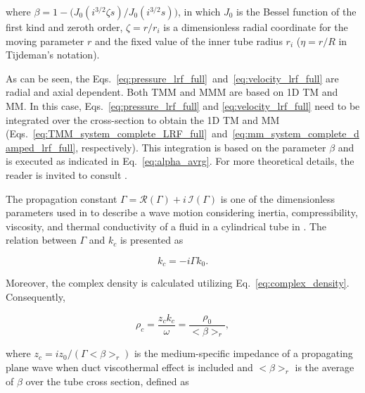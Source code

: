 \documentclass[12pt]{article}
\begin{document}

\noindent where $\beta = 1 - \big( J_0(i^{3/2} \zeta s) /J_0(i^{3/2} s) \big)$, in which $J_0$ is the Bessel function of the first kind and zeroth order,  $\zeta = r/r_i$ is a dimensionless radial coordinate for the moving parameter $r$ and the fixed value of the inner tube radius $r_i$ ($\eta = r/R$ in Tijdeman's notation). 

As can be seen, the Eqs.~\ref{eq:pressure_lrf_full}~and~\ref{eq:velocity_lrf_full} are radial and axial dependent. Both \acrshort{TMM} and \acrshort{MMM} are based on 1D \acrshort{TM} and \acrshort{MM}. In this case, Eqs.~\ref{eq:pressure_lrf_full} and \ref{eq:velocity_lrf_full} need to be integrated over the cross-section to obtain the 1D \acrshort{TM} and \acrshort{MM} (Eqs.~\ref{eq:TMM_system_complete_LRF_full}~and~\ref{eq:mm_system_complete_damped_lrf_full}, respectively). This integration is based on the parameter $\beta$ and is executed as indicated in Eq.~\ref{eq:alpha_avrg}. For more theoretical details, the reader is invited to consult \cite{TIJDEMAN19751, stinson}.

The propagation constant $\Gamma = \mathcal{R}(\Gamma) + i \, \mathcal{I}(\Gamma)$ is one of the dimensionless parameters used in \cite{TIJDEMAN19751} to describe a wave motion considering inertia, compressibility, viscosity,
and thermal conductivity of a fluid in a cylindrical tube in \cite{TIJDEMAN19751}. The relation between $\Gamma$ and $k_c$ is presented as \cite{TIJDEMAN19751,eerden_phdthesis_2000,mareze_jsv}

\begin{equation}\label{eq:kc_lrffull}
	k_c = -i \Gamma k_0.
\end{equation}

\noindent Moreover, the complex density is calculated utilizing Eq.~\ref{eq:complex_density}. Consequently,

\begin{equation}
	\rho_c = \frac{z_c k_c}{\omega} = \frac{\rho_0}{<\beta>_r},
\end{equation}

\noindent where $z_c = i z_0 / (\Gamma <\beta>_r)$ is the medium-specific impedance of a propagating plane wave when duct viscothermal effect is included and $<\beta>_r$ is the average of $\beta$ over the tube cross section, defined as
\end{document}
